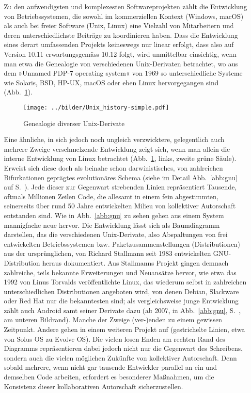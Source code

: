 \documentclass[a4paper,10pt]{article}
\newcommand{\anf}[1]{»#1«}
\begin{document}
Zu den aufwendigsten und komplexesten Softwareprojekten zählt die Entwicklung von Betriebssystemen, die sowohl im kommerziellen Kontext (Windows, macOS) als auch bei freier Software (Unix, Linux) eine Vielzahl von Mitarbeitern und deren unterschiedlichste Beiträge zu koordinieren haben. Dass die Entwicklung eines derart umfassenden Projekts keineswegs nur linear erfolgt, dass also auf Version 10.11 erwartungsgemäss 10.12 folgt, wird unmittelbar einsichtig, wenn man etwa die Genealogie von verschiedenen Unix-Derivaten betrachtet, wo aus dem \anf{Unnamed PDP-7 operating system} von 1969 so unterschiedliche Systeme wie Solaris, BSD, HP-UX, macOS oder eben Linux hervorgegangen sind (Abb.~\ref{abb:unix}).

\begin{figure}[ht]
\begin{center}
\texttt{[image: ../bilder/Unix\_history-simple.pdf]}\\[-3mm]
\caption{Genealogie diverser Unix-Derivate}\label{abb:unix}
\end{center}
\end{figure}

Eine ähnliche, in sich jedoch noch ungleich verzwicktere, gelegentlich auch mehrere Zweige verschmelzende Entwicklung zeigt sich, wenn man allein die interne Entwicklung von Linux betrachtet (Abb.~\ref{abb:unix}, links, zweite grüne Säule). Erweist sich diese doch als beinahe schon darwinistisches, von zahlreichen Bifurkationen geprägtes evolutionäres Schema  (siehe im Detail Abb.~\ref{abb:gnu} auf S.~\pageref{toc:gnu}). Jede dieser zur Gegenwart strebenden Linien repräsentiert Tausende, oftmals Millionen Zeilen Code, die allesamt in einem fein abgestimmten, seinerseits über rund 50 Jahre entwickelten Milieu von kollektiver Autorschaft entstanden sind. Wie in Abb.~\ref{abb:gnu} zu sehen gehen aus einem System mannigfache neue hervor. Die Entwicklung lässt sich als Baumdiagramm darstellen, das die verschiedenen Unix-Derivate, also Abspaltungen von frei entwickelten Betriebssystemen bzw. Paketzusammenstellungen (Distributionen) aus der ursprünglichen, von Richard Stallmann seit 1983 entwickelten GNU-Distribution heraus dokumentiert. Aus Stallmanns Projekt gingen demnach zahlreiche, teils bekannte Erweiterungen und Neuansätze hervor, wie etwa das 1992 von Linus Torvalds veröffentlichte Linux, das wiederum selbst in zahlreichen unterschiedlichen Distributionen angeboten wird, von denen Debian, Slackware oder Red Hat nur die bekanntesten sind; als vergleichsweise junge Entwicklung zählt auch Android samt seiner Derivate dazu (ab 2007, in Abb.~\ref{abb:gnu}, S.~\pageref{abb:gnu}, am unteren Bildrand). Manche der Zweige (ver-)enden zu einem gewissen Zeitpunkt. Andere gehen in einem weiteren Projekt auf (gestrichelte Linien, etwa von Solus OS zu Evolve OS). Die vielen losen Enden am rechten Rand des Diagramms repräsentieren dabei jedoch nicht nur die Gegenwart des Schreibens, sondern auch die vielen möglichen Zukünfte von kollektiver Autorschaft. Denn sobald mehrere, wenn nicht gar tausende Entwickler parallel an ein und demselben Code arbeiten, erfordert es besonderer Maßnahmen, um die Konsistenz dieser kollaborativen Autorschaft sicherzustellen. 
\end{document}
